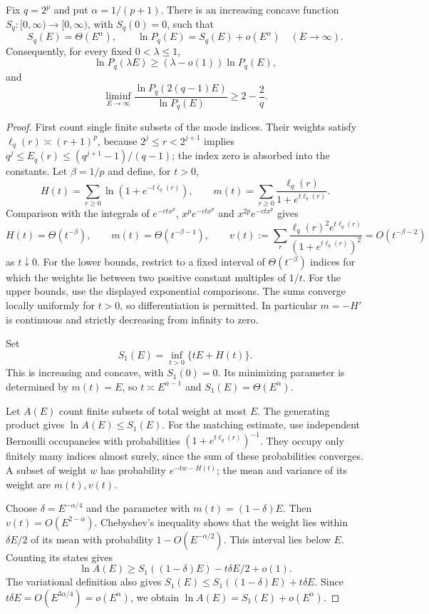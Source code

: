 \begin{theorem}\label{thm:curve-count-envelope}
Fix $q=2^p$ and put $\alpha=1/(p+1)$. There is an increasing concave function $S_q:[0,\infty)\to[0,\infty)$, with $S_q(0)=0$, such that
\[
 S_q(E)=\Theta(E^\alpha),\qquad
 \ln P_q(E)=S_q(E)+o(E^\alpha)\quad(E\longrightarrow\infty).
\]
Consequently, for every fixed $0<\lambda\leq1$,
\[
 \ln P_q(\lambda E)\geq(\lambda-o(1))\ln P_q(E),
\]
and
\begin{equation}\label{eq:curve-count-ratio}
 \liminf_{E\to\infty}
 \frac{\ln P_q(2(q-1)E)}{\ln P_q(E)}\geq2-\frac2q.
\end{equation}
\end{theorem}
\begin{proof}
First count single finite subsets of the mode indices. Their weights satisfy
$\ell_q(r)\asymp(r+1)^p$,
because $2^j\leq r<2^{j+1}$ implies
$q^j\leq E_q(r)\leq(q^{j+1}-1)/(q-1)$; the index zero is absorbed into the constants. Let $\beta=1/p$ and define, for $t>0$,
\[
 H(t)=\sum_{r\geq0}\ln(1+e^{-t\ell_q(r)}),\qquad
 m(t)=\sum_{r\geq0}\frac{\ell_q(r)}{1+e^{t\ell_q(r)}}.
\]
Comparison with the integrals of $e^{-ct x^p}$, $x^pe^{-ct x^p}$ and $x^{2p}e^{-ct x^p}$ gives
\[
 H(t)=\Theta(t^{-\beta}),\qquad
 m(t)=\Theta(t^{-\beta-1}),\qquad
 v(t):=\sum_r\frac{\ell_q(r)^2e^{t\ell_q(r)}}{(1+e^{t\ell_q(r)})^2}
 =O(t^{-\beta-2})
\]
as $t\downarrow0$. For the lower bounds, restrict to a fixed interval of $\Theta(t^{-\beta})$ indices for which the weights lie between two positive constant multiples of $1/t$. For the upper bounds, use the displayed exponential comparisons. The sums converge locally uniformly for $t>0$, so differentiation is permitted. In particular $m=-H'$ is continuous and strictly decreasing from infinity to zero.

Set
\[
 S_1(E)=\inf_{t>0}\{tE+H(t)\}.
\]
This is increasing and concave, with $S_1(0)=0$. Its minimizing parameter is determined by $m(t)=E$, so $t\asymp E^{\alpha-1}$ and $S_1(E)=\Theta(E^\alpha)$.

Let $A(E)$ count finite subsets of total weight at most $E$. The generating product gives $\ln A(E)\leq S_1(E)$. For the matching estimate, use independent Bernoulli occupancies with probabilities $(1+e^{t\ell_q(r)})^{-1}$. They occupy only finitely many indices almost surely, since the sum of these probabilities converges. A subset of weight $w$ has probability $e^{-tw-H(t)}$; the mean and variance of its weight are $m(t),v(t)$.

Choose $\delta=E^{-\alpha/4}$ and the parameter with $m(t)=(1-\delta)E$. Then $v(t)=O(E^{2-\alpha})$. Chebyshev's inequality shows that the weight lies within $\delta E/2$ of its mean with probability $1-O(E^{-\alpha/2})$. This interval lies below $E$. Counting its states gives
\[
 \ln A(E)\geq S_1((1-\delta)E)-t\delta E/2+o(1).
\]
The variational definition also gives
$S_1(E)\leq S_1((1-\delta)E)+t\delta E$.
Since $t\delta E=O(E^{3\alpha/4})=o(E^\alpha)$, we obtain
$\ln A(E)=S_1(E)+o(E^\alpha)$.


\end{proof}
